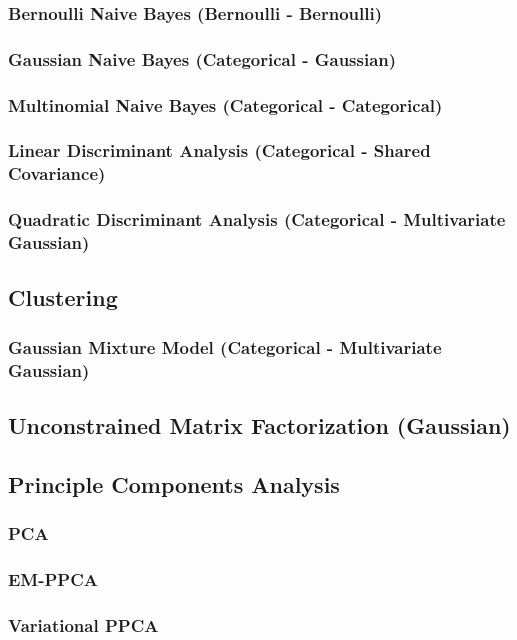 \subsubsection{Bernoulli Naive Bayes (Bernoulli - Bernoulli)}
\subsubsection{Gaussian Naive Bayes (Categorical - Gaussian)}
\subsubsection{Multinomial Naive Bayes (Categorical - Categorical)}
\subsubsection{Linear Discriminant Analysis (Categorical - Shared Covariance)}
\subsubsection{Quadratic Discriminant Analysis (Categorical - Multivariate Gaussian)}

\subsection{Clustering}
\subsubsection{Gaussian Mixture Model (Categorical - Multivariate Gaussian)}

\subsection{Unconstrained Matrix Factorization (Gaussian)}

\subsection{Principle Components Analysis}
\subsubsection{PCA}
\subsubsection{EM-PPCA}
\subsubsection{Variational PPCA}

